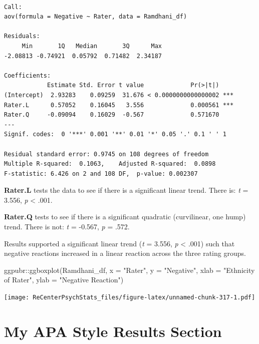 \documentclass[
  11pt,
]{book}
\newenvironment{Shaded}{\begin{snugshade}}{\end{snugshade}}
\newcommand{\AttributeTok}[1]{\textcolor[rgb]{0.77,0.63,0.00}{#1}}
\newcommand{\FunctionTok}[1]{\textcolor[rgb]{0.00,0.00,0.00}{#1}}
\newcommand{\NormalTok}[1]{#1}
\newcommand{\SpecialCharTok}[1]{\textcolor[rgb]{0.00,0.00,0.00}{#1}}
\newcommand{\StringTok}[1]{\textcolor[rgb]{0.31,0.60,0.02}{#1}}
\begin{document}
\begin{verbatim}

Call:
aov(formula = Negative ~ Rater, data = Ramdhani_df)

Residuals:
     Min       1Q   Median       3Q      Max 
-2.08813 -0.74921  0.05792  0.71482  2.34187 

Coefficients:
            Estimate Std. Error t value             Pr(>|t|)    
(Intercept)  2.93283    0.09259  31.676 < 0.0000000000000002 ***
Rater.L      0.57052    0.16045   3.556             0.000561 ***
Rater.Q     -0.09094    0.16029  -0.567             0.571670    
---
Signif. codes:  0 '***' 0.001 '**' 0.01 '*' 0.05 '.' 0.1 ' ' 1

Residual standard error: 0.9745 on 108 degrees of freedom
Multiple R-squared:  0.1063,    Adjusted R-squared:  0.0898 
F-statistic: 6.426 on 2 and 108 DF,  p-value: 0.002307
\end{verbatim}

\textbf{Rater.L} tests the data to see if there is a significant linear trend. There is: \emph{t} = 3.556, \emph{p} \textless{} .001.

\textbf{Rater.Q} tests to see if there is a significant quadratic (curvilinear, one hump) trend. There is not: \emph{t} = -0.567, \emph{p} = .572.

Results supported a significant linear trend (\emph{t} = 3.556, \emph{p} \textless{} .001) such that negative reactions increased in a linear reaction across the three rating groups.

\begin{Shaded}
\begin{Highlighting}[]
\NormalTok{ggpubr}\SpecialCharTok{::}\FunctionTok{ggboxplot}\NormalTok{(Ramdhani\_df, }\AttributeTok{x =} \StringTok{"Rater"}\NormalTok{, }\AttributeTok{y =} \StringTok{"Negative"}\NormalTok{, }\AttributeTok{xlab =} \StringTok{"Ethnicity of Rater"}\NormalTok{,}
    \AttributeTok{ylab =} \StringTok{"Negative Reaction"}\NormalTok{)}
\end{Highlighting}
\end{Shaded}

\texttt{[image: ReCenterPsychStats\_files/figure-latex/unnamed-chunk-317-1.pdf]}

\hypertarget{my-apa-style-results-section}{%
\section{My APA Style Results Section}\label{my-apa-style-results-section}}
\end{document}
